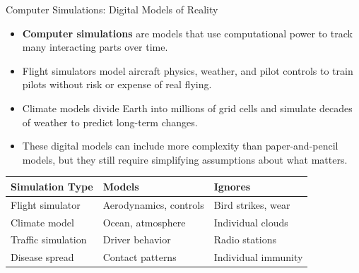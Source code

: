 \documentclass{beamer}
\begin{document}
	\begin{frame}{Computer Simulations: Digital Models of Reality}
		\begin{itemize}
			\item \textbf{Computer simulations} are models that use computational power to track many interacting parts over time.
			\item Flight simulators model aircraft physics, weather, and pilot controls to train pilots without risk or expense of real flying.
			\item Climate models divide Earth into millions of grid cells and simulate decades of weather to predict long-term changes.
			\item These digital models can include more complexity than paper-and-pencil models, but they still require simplifying assumptions about what matters.
		\end{itemize}
		
		\begin{table}
			\centering
			\small
			\begin{tabular}{lll}
				\toprule
				Simulation Type & Models & Ignores \\
				\midrule
				Flight simulator & Aerodynamics, controls & Bird strikes, wear \\
				Climate model & Ocean, atmosphere & Individual clouds \\
				Traffic simulation & Driver behavior & Radio stations \\
				Disease spread & Contact patterns & Individual immunity \\
				\bottomrule
			\end{tabular}
		\end{table}
	\end{frame}
	
\end{document}
